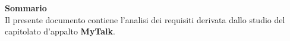 \begin{center}
\Large{\textbf{Sommario}}\\
{
\normalsize
Il presente documento contiene l'analisi dei requisiti derivata dallo studio del capitolato d'appalto \textbf{MyTalk}.
}
\end{center}